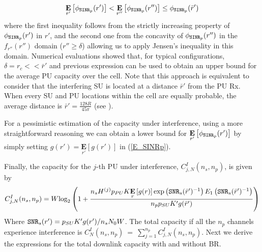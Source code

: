 \begin{equation}
\underset{r'}{\mathbf{E}}\left[\phi_{\text{\ttfamily{SINR}}_{p}}(r')\right] < \underset{r''}{\mathbf{E}}\left[\phi_{\text{\ttfamily{SINR}}_{p}}(r'')\right]
\leq \phi_{\text{\ttfamily{SINR}}_{p}}(\bar{r}')
\end{equation}
where the first inequality follows from the strictly increasing property of $\phi_{\text{\ttfamily{SINR}}_{p}}(r')$ in $r'$, and the second one from the concavity of $\phi_{\text{\ttfamily{SINR}}_{p}}(r'')$ in the $f_{r''}(r'')$ domain ($r''\geq\delta$) allowing us to apply Jensen's inequality in this domain. Numerical evaluations showed that, for typical configurations, $\delta=r_{c}<<\bar{r}'$ and previous expression can be used to obtain an upper bound for the average PU capacity over the cell. Note that this approach is equivalent to consider that the interfering SU is located at a distance $\bar{r}'$ from the PU Rx. When every SU and PU locations within the cell are equally probable, the average distance is $\bar{r}' = \frac{128R}{45\pi}$ (see \cite{ref:Solomon1978}). 

For a pessimistic estimation of the capacity under interference, using a more straightforward reasoning we can obtain a lower bound for $\underset{r'}{\mathbf{E}}\left[\phi_{\text{\ttfamily{SINR}}_{p}}(r')\right]$ by simply setting $g(r')=\underset{r'}{\mathbf{E}}\left[g(r')\right]$ in (\ref{E_SINRp}).


Finally, the capacity for the $j$-th PU under interference, $C^{I}_{j,N}(n_{s},n_{p})$, is given by
\begin{equation}\label{CIjN}
C^{I}_{j,N}(n_{s},n_{p}) = \\
W\text{log}_{2}\left(1+
\frac{n_{s}H^{(j)}p_{PU}K\underset{r}{\mathbf{E}}\left[g(r)\right]\text{exp}\left(\text{\ttfamily{SNR}}_{s}(\bar{r}')^{-1}\right)E_{1}\left(\text{\ttfamily{SNR}}_{s}(\bar{r}')^{-1}\right)}
{n_{p}p_{SU}K'g(\bar{r}')}\right)
\end{equation}
Where $\text{\ttfamily{SNR}}_{s}(r') = p_{SU}K'g(r')/n_{s}N_{0}W$.
The total capacity if all the $n_{p}$ channels experience interference is $C^{I}_{N}(n_{s},n_{p})~=~\sum_{j=1}^{n_{p}}C^{I}_{j,N}(n_{s},n_{p})$.
Next we derive the expressions for the total downlink capacity with and without BR.


